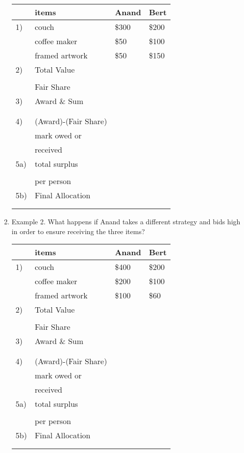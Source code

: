 \documentclass[12pt]{article}
\begin{document}
\begin{enumerate}
\begin{tabular}{l|l|p{2in}|p{2in}|}
&items&Anand&Bert\\
\hline
1)&couch&\$300&\$200\\
&coffee maker&\$50&\$100\\
&framed artwork&\$50&\$150\\
\hline
2)&Total Value&&\\
&&&\\
&Fair Share&&\\
\hline
3)& Award \& Sum&&\\
&&&\\
&&&\\
\hline
4)& (Award)-(Fair Share)&&\\
&mark owed or &&\\
&received&&\\
\hline
5a)& total surplus &&\\
&&&\\
&per person&&\\
\hline
5b)&Final Allocation&&\\
&&&\\
&&&\\
\end{tabular}
\item Example 2. What happens if Anand takes a different strategy and bids high in order to ensure receiving the three items?

\begin{tabular}{l|l|p{2in}|p{2in}|}
&items&Anand&Bert\\
\hline
1)&couch&\$400&\$200\\
&coffee maker&\$200&\$100\\
&framed artwork&\$100&\$60\\
\hline
2)&Total Value&&\\
&&&\\
&Fair Share&&\\
\hline
3)& Award \& Sum&&\\
&&&\\
&&&\\
\hline
4)& (Award)-(Fair Share)&&\\
&mark owed or &&\\
&received&&\\
\hline
5a)& total surplus &&\\
&&&\\
&per person&&\\
\hline
5b)&Final Allocation&&\\
&&&\\
&&&\\
\end{tabular}


\end{enumerate}
\end{document}
